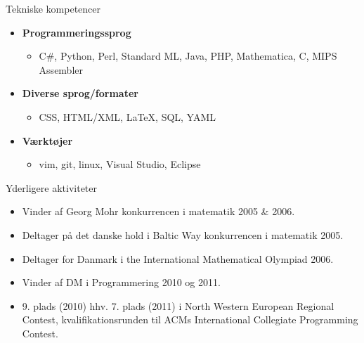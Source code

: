 \documentclass[11pt,oneside,a4paper]{article}
\newenvironment{ressection}[1]{
	\vspace{4pt}
	{\fontfamily{phv}\selectfont\Large#1}
	\begin{itemize}
	\vspace{3pt}
}{
	\end{itemize}
}
\newcommand{\resitem}[1]{
	\vspace{-4pt}
	\item \begin{flushleft} #1 \end{flushleft}
}
\newenvironment{reslist}[1]{
	\resitem{\textbf{#1}}
	\vspace{-2pt}
	\begin{itemize}
}{
	\end{itemize}
}
\begin{document}

\begin{ressection}{Tekniske kompetencer}
	\begin{reslist}{Programmeringssprog}
		\resitem{C\#, Python, Perl, Standard ML, Java, PHP, Mathematica, C, MIPS Assembler}
	\end{reslist}
	
	\begin{reslist}{Diverse sprog/formater}
		\resitem{CSS, HTML/XML, \LaTeX, SQL, YAML}
	\end{reslist}

    \begin{reslist}{Værktøjer}
		\resitem{vim, git, linux, Visual Studio, Eclipse}
	\end{reslist}
\end{ressection}


\begin{ressection}{Yderligere aktiviteter}

	\resitem{Vinder af Georg Mohr konkurrencen i matematik 2005 \& 2006.}
	
	\resitem{Deltager på det danske hold i Baltic Way konkurrencen i matematik 2005.}
	
	\resitem{Deltager for Danmark i the International Mathematical Olympiad 2006.}

    \resitem{Vinder af DM i Programmering 2010 og 2011.}

    \resitem{9. plads (2010) hhv. 7. plads (2011) i North Western European Regional Contest,
             kvalifikationsrunden til ACMs International Collegiate Programming Contest.}

\end{ressection}
\end{document}
